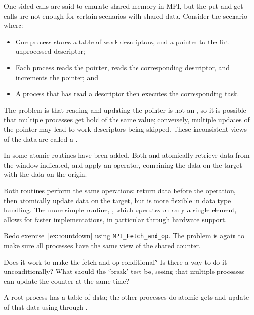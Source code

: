 One-sided calls are said to emulate shared memory in MPI, but 
the put and get calls are not enough for certain scenarios with shared
data. Consider the scenario where:
\begin{itemize}
\item One process stores a table of work descriptors, and a pointer to
  the firt unprocessed descriptor;
\item Each process reads the pointer, reads the corresponding
  descriptor, and increments the pointer; and
\item A process that has read a descriptor then executes the
  corresponding task.
\end{itemize}
The problem is that reading and updating the pointer is not an
, so
it is possible that multiple processes get hold of the same value;
conversely, multiple updates of the pointer may lead to work
descriptors being skipped. These inconsistent views of the data are
called a .

In  some atomic routines have been added.
Both  and 
atomically retrieve data from the window indicated,
and apply an operator, combining the data on the target
with the data on the origin.
%
%

Both routines perform the same operations: return data before the
operation, then atomically update data on the target, but
 is more flexible in data type
handling. The more simple routine, ,
which operates on only a single element,
allows for faster implementations, in particular through hardware support.

\begin{exercise}
  \label{ex:countdownop}
  Redo exercise~\ref{ex:countdown} using \lstinline$MPI_Fetch_and_op$. The
  problem is again to make sure all processes have the same view of
  the shared counter.

  Does it work to make the fetch-and-op conditional? Is there a way to
  do it unconditionally? What should the `break' test be, seeing that
  multiple processes can update the counter at the same time?
\end{exercise}

\begin{example}
  A root process has a table of data; the other processes do 
  atomic gets and update of that data using
   through .
\end{example}

